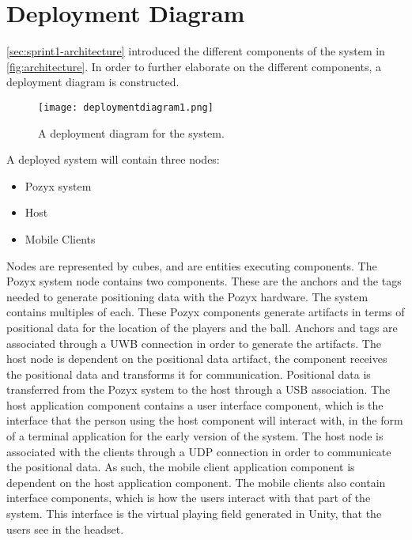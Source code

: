 \section{Deployment Diagram}\label{sec:sprint2-deploymentdia}
\autoref{sec:sprint1-architecture} introduced the different components of the system in \autoref{fig:architecture}.
In order to further elaborate on the different components, a deployment diagram is constructed.
\begin{figure}[H]
    \centering
    \texttt{[image: deploymentdiagram1.png]}
    \caption{A deployment diagram for the system.}
    \label{fig:sprint2-deployment}
\end{figure}
\noindent
A deployed system will contain three nodes:
\begin{itemize}
    \item Pozyx system
    \item Host
    \item Mobile Clients
\end{itemize}
Nodes are represented by cubes, and are entities executing components.
The Pozyx system node contains two components.
These are the anchors and the tags needed to generate positioning data with the Pozyx hardware.
The system contains multiples of each.
These Pozyx components generate artifacts in terms of positional data for the location of the players and the ball.
Anchors and tags are associated through a UWB connection in order to generate the artifacts.
The host node is dependent on the positional data artifact, the component receives the positional data and transforms it for communication.
Positional data is transferred from the Pozyx system to the host through a USB association.
The host application component contains a user interface component, which is the interface that the person using the host component will interact with, in the form of a terminal application for the early version of the system.
The host node is associated with the clients through a UDP connection in order to communicate the positional data.
As such, the mobile client application component is dependent on the host application component.
The mobile clients also contain interface components, which is how the users interact with that part of the system.
This interface is the virtual playing field generated in Unity, that the users see in the headset.
